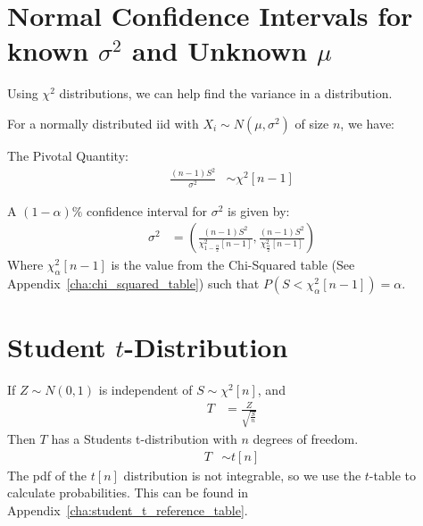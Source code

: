            \section{Normal Confidence Intervals for known $\sigma^2$ and Unknown $\mu$} %
            \label{sec:normal_confidence_intervals_for_sigma_squared}
                Using $\chi^2$ distributions, we can help find the variance in a distribution.

                For a normally distributed iid with $X_i \sim N(\mu, \sigma^2)$ of size $n$, we have:

                The Pivotal Quantity:
                \begin{align*}
                    \frac{(n-1)S^2}{\sigma^2} &\sim \chi^2[n - 1]
                \end{align*}

                A $(1 - \alpha)\%$ confidence interval for $\sigma^2$ is given by:
                \begin{align*}
                    \sigma^2 &=
                    \left(
                        \frac{(n-1)S^2}{\chi_{1-\frac{\alpha}{2}}^2 [n - 1]},
                        \frac{(n-1)S^2}{\chi_{\frac{\alpha}{2}}^2 [n - 1]}
                    \right)
                \end{align*}
                Where $\chi_\alpha^2 [n-1]$ is the value from the Chi-Squared table (See Appendix~\ref{cha:chi_squared_table}) such that $P(S < \chi_\alpha^2 [n-1]) = \alpha$.
            \section{Student $t$-Distribution} %
            \label{sec:student_t_distribution}
                If $Z \sim N(0, 1)$ is independent of $S \sim \chi^2[n]$, and
                \begin{align*}
                    T &= \frac{Z}{\sqrt{\frac{S}{n}}}
                \end{align*}
                Then $T$ has a Students t-distribution with $n$ degrees of freedom.
                \begin{align*}
                    T &\sim t[n]
                \end{align*}
                The pdf of the $t[n]$ distribution is not integrable, so we use the $t$-table to calculate probabilities.
                This can be found in Appendix~\ref{cha:student_t_reference_table}.
